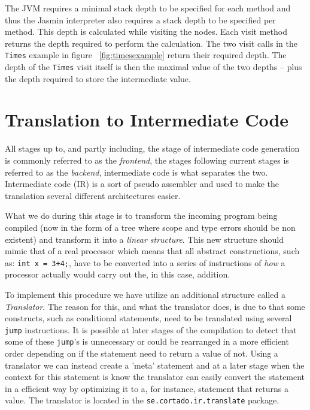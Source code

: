 \documentclass[11pt]{amsart}
\begin{document}
The JVM requires a minimal stack depth to be specified for each method and thus the Jasmin interpreter also requires a stack depth to be specified per method. This depth is calculated while visiting the nodes. Each visit method returns the depth required to perform the calculation. The two visit calls in the \texttt{Times} example in figure ~\ref{fig:timesexample} return their required depth. The depth of the \texttt{Times} visit itself is then the maximal value of the two depths -- plus the depth required to store the intermediate value. 

\section{Translation to Intermediate Code}
All stages up to, and partly including, the stage of intermediate code generation is commonly referred to as the \textit{frontend}, the stages following current stages is referred to as the \textit{backend}, intermediate code is what separates the two. Intermediate code (IR) is a sort of pseudo assembler and used to make the translation several different architectures easier. 

What we do during this stage is to transform the incoming program being compiled (now in the form of a tree where scope and type errors should be non existent) and transform it into a \textit{linear structure}. This new structure should mimic that of a real processor which means that all abstract constructions, such as: \texttt{int x = 3+4;}, have to be converted into a series of instructions of \textit{how} a processor actually would carry out the, in this case, addition.

To implement this procedure we have utilize an additional structure called a \textit{Translator}. The reason for this, and what the translator does, is due to that some constructs, such as conditional statements, need to be translated using several \texttt{jump} instructions. It is possible at later stages of the compilation to detect that some of these \texttt{jump}'s is unnecessary or could be rearranged in a more efficient order depending on if the statement need to return a value of not. Using a translator we can instead create a 'meta' statement and at a later stage when the context for this statement is know the translator can easily convert the statement in a efficient way by optimizing it to a, for instance, statement that returns a value. The translator is located in the \texttt{se.cortado.ir.translate} package.
\end{document}
